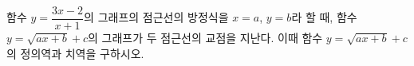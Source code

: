 \hspace*{2mm}\begin{minipage}[t]{\dimexpr\linewidth-2mm\relax}\vspace{0pt}
함수 $y=\dfrac{3x-2}{x+1}$의 그래프의 점근선의 방정식을 $x=a$, $y=b$라 할 때, 함수 $y=\sqrt{ax+b}+c$의 그래프가 두 점근선의 교점을 지난다. 이때 함수 $y=\sqrt{ax+b}+c$의 정의역과 치역을 구하시오. \end{minipage}
